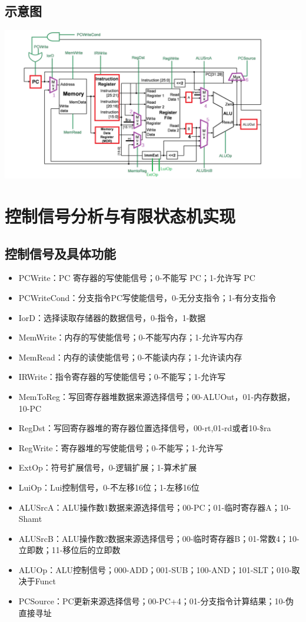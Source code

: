 \documentclass{article}
\begin{document}
\subsection{示意图}
\begin{center}
    \includegraphics[width = 16cm]{images/mipscpu.jpg}
\end{center}

\section{控制信号分析与有限状态机实现}
\subsection{控制信号及具体功能}
\begin{itemize}
    \item PCWrite：PC 寄存器的写使能信号；0-不能写 PC；1-允许写 PC
    \item PCWriteCond：分支指令PC写使能信号，0-无分支指令；1-有分支指令
    \item IorD：选择读取存储器的数据信号，0-指令，1-数据
    \item MemWrite：内存的写使能信号；0-不能写内存；1-允许写内存
    \item MemRead：内存的读使能信号；0-不能读内存；1-允许读内存
    \item IRWrite：指令寄存器的写使能信号；0-不能写；1-允许写
    \item MemToReg：写回寄存器堆数据来源选择信号；00-ALUOut，01-内存数据，10-PC
    \item RegDst：写回寄存器堆的寄存器位置选择信号，00-rt,01-rd或者10-\$ra
    \item RegWrite：寄存器堆的写使能信号；0-不能写；1-允许写
    \item ExtOp：符号扩展信号，0-逻辑扩展；1-算术扩展
    \item LuiOp：Lui控制信号，0-不左移16位；1-左移16位
    \item ALUSrcA：ALU操作数1数据来源选择信号；00-PC；01-临时寄存器A；10-Shamt
    \item ALUSrcB：ALU操作数2数据来源选择信号；00-临时寄存器B；01-常数4；10-立即数；11-移位后的立即数
    \item ALUOp：ALU控制信号；000-ADD；001-SUB；100-AND；101-SLT；010-取决于Funct
    \item PCSource：PC更新来源选择信号；00-PC+4；01-分支指令计算结果；10-伪直接寻址
\end{itemize}
\end{document}
